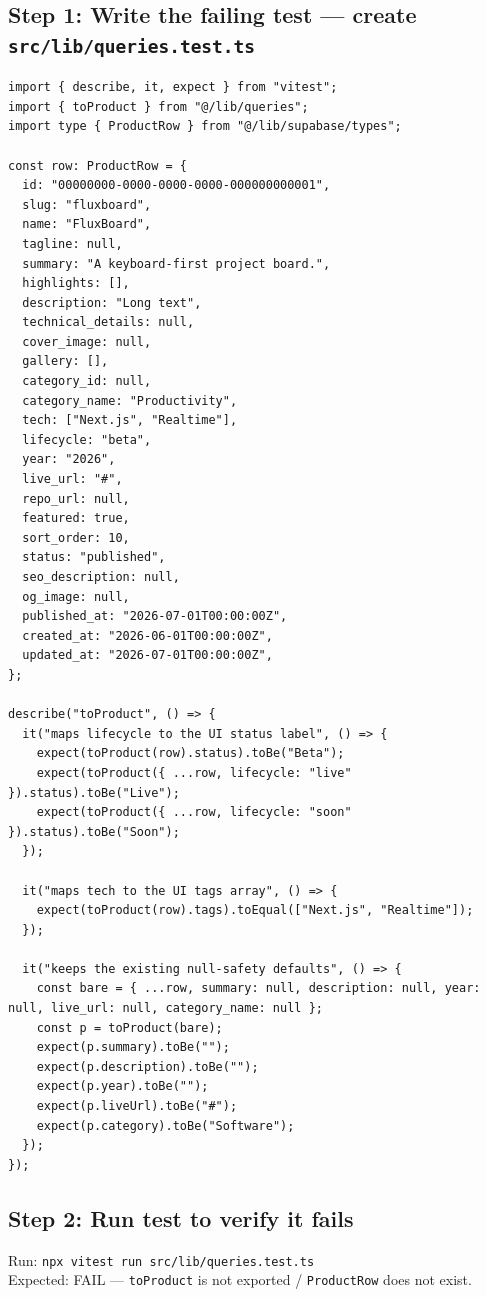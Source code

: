 \documentclass[11pt,a4paper]{article}
\begin{document}
\subsection*{Step 1: Write the failing test --- create \texttt{src/lib/queries.test.ts}}

\begin{lstlisting}
import { describe, it, expect } from "vitest";
import { toProduct } from "@/lib/queries";
import type { ProductRow } from "@/lib/supabase/types";

const row: ProductRow = {
  id: "00000000-0000-0000-0000-000000000001",
  slug: "fluxboard",
  name: "FluxBoard",
  tagline: null,
  summary: "A keyboard-first project board.",
  highlights: [],
  description: "Long text",
  technical_details: null,
  cover_image: null,
  gallery: [],
  category_id: null,
  category_name: "Productivity",
  tech: ["Next.js", "Realtime"],
  lifecycle: "beta",
  year: "2026",
  live_url: "#",
  repo_url: null,
  featured: true,
  sort_order: 10,
  status: "published",
  seo_description: null,
  og_image: null,
  published_at: "2026-07-01T00:00:00Z",
  created_at: "2026-06-01T00:00:00Z",
  updated_at: "2026-07-01T00:00:00Z",
};

describe("toProduct", () => {
  it("maps lifecycle to the UI status label", () => {
    expect(toProduct(row).status).toBe("Beta");
    expect(toProduct({ ...row, lifecycle: "live" }).status).toBe("Live");
    expect(toProduct({ ...row, lifecycle: "soon" }).status).toBe("Soon");
  });

  it("maps tech to the UI tags array", () => {
    expect(toProduct(row).tags).toEqual(["Next.js", "Realtime"]);
  });

  it("keeps the existing null-safety defaults", () => {
    const bare = { ...row, summary: null, description: null, year: null, live_url: null, category_name: null };
    const p = toProduct(bare);
    expect(p.summary).toBe("");
    expect(p.description).toBe("");
    expect(p.year).toBe("");
    expect(p.liveUrl).toBe("#");
    expect(p.category).toBe("Software");
  });
});
\end{lstlisting}

\subsection*{Step 2: Run test to verify it fails}

Run: \texttt{npx vitest run src/lib/queries.test.ts}\\
Expected: FAIL --- \texttt{toProduct} is not exported / \texttt{ProductRow} does not exist.
\end{document}
